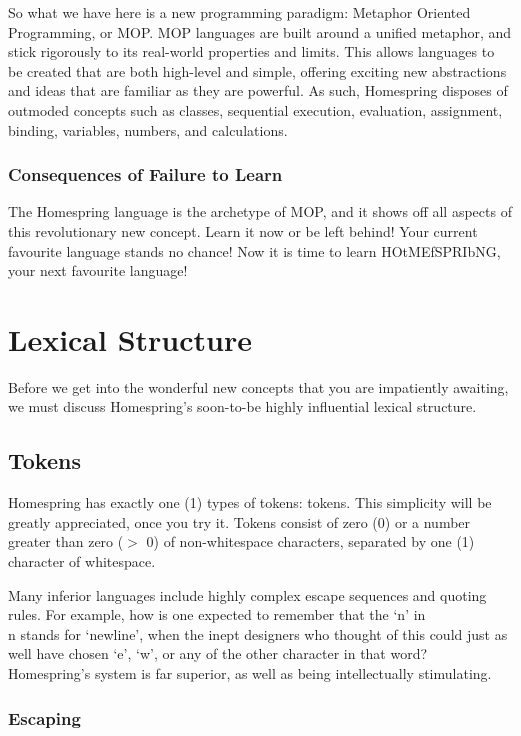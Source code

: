 \documentclass[10pt]{article}
\begin{document}
So what we have here is a new programming paradigm: Metaphor Oriented Programming, or MOP.
MOP languages are built around a unified metaphor, and stick rigorously to its real-world properties and limits.
This allows languages to be created that are both high-level and simple, offering exciting new abstractions and ideas that are familiar as they are powerful.
As such, Homespring disposes of outmoded concepts such as classes, sequential execution, evaluation, assignment, binding, variables, numbers, and calculations.

\subsubsection{Consequences of Failure to Learn}

The Homespring language is the archetype of MOP, and it shows off all aspects of this revolutionary new concept.
Learn it now or be left behind!
Your current favourite language stands no chance!
Now it is time to learn HOtMEfSPRIbNG, your next favourite language!

\section{Lexical Structure}

Before we get into the wonderful new concepts that you are impatiently awaiting, we must discuss Homespring's soon-to-be highly influential lexical structure.

\subsection{Tokens}

Homespring has exactly one (1) types of tokens: tokens.
This simplicity will be greatly appreciated, once you try it.
Tokens consist of zero (0) or a number greater than zero ($>$ 0) of non-whitespace characters, separated by one (1) character of whitespace.

Many inferior languages include highly complex escape sequences and quoting rules.
For example, how is one expected to remember that the `n' in \\n stands for `newline', when the inept designers who thought of this could just as well have
chosen `e', `w', or any of the other character in that word? Homespring's system is far superior, as well as being intellectually stimulating.

\subsubsection{Escaping}
\end{document}
